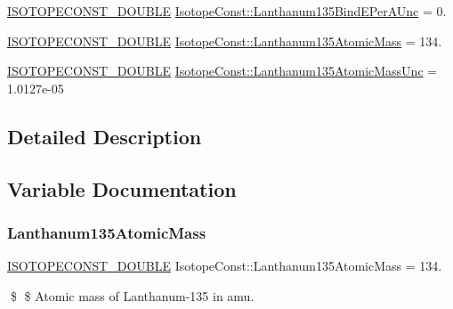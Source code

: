 \begin{DoxyCompactItemize}
\mbox{\hyperlink{group___isotope_const-_macros_ga8f45a7272ce02c0b4c65c44636ed719a}{I\+S\+O\+T\+O\+P\+E\+C\+O\+N\+S\+T\+\_\+\+D\+O\+U\+B\+LE}} \mbox{\hyperlink{group___isotope_const-_lanthanum-_la135_ga762828c68b37076891bc9b852ed06526}{Isotope\+Const\+::\+Lanthanum135\+Bind\+E\+Per\+A\+Unc}} = 0.
\item 
\mbox{\hyperlink{group___isotope_const-_macros_ga8f45a7272ce02c0b4c65c44636ed719a}{I\+S\+O\+T\+O\+P\+E\+C\+O\+N\+S\+T\+\_\+\+D\+O\+U\+B\+LE}} \mbox{\hyperlink{group___isotope_const-_lanthanum-_la135_ga94e1754aa7f40b00c7176e3f3a611619}{Isotope\+Const\+::\+Lanthanum135\+Atomic\+Mass}} = 134.
\item 
\mbox{\hyperlink{group___isotope_const-_macros_ga8f45a7272ce02c0b4c65c44636ed719a}{I\+S\+O\+T\+O\+P\+E\+C\+O\+N\+S\+T\+\_\+\+D\+O\+U\+B\+LE}} \mbox{\hyperlink{group___isotope_const-_lanthanum-_la135_ga64df983473f501711ad2a94d500e7c33}{Isotope\+Const\+::\+Lanthanum135\+Atomic\+Mass\+Unc}} = 1.\+0127e-\/05
\end{DoxyCompactItemize}


\subsection{Detailed Description}


\subsection{Variable Documentation}
\mbox{\label{group___isotope_const-_lanthanum-_la135_ga94e1754aa7f40b00c7176e3f3a611619}} 
\subsubsection{\texorpdfstring{Lanthanum135\+Atomic\+Mass}{Lanthanum135AtomicMass}}
{\footnotesize\ttfamily \mbox{\hyperlink{group___isotope_const-_macros_ga8f45a7272ce02c0b4c65c44636ed719a}{I\+S\+O\+T\+O\+P\+E\+C\+O\+N\+S\+T\+\_\+\+D\+O\+U\+B\+LE}} Isotope\+Const\+::\+Lanthanum135\+Atomic\+Mass = 134.}

\$ \$ Atomic mass of Lanthanum-\/135 in amu. \mbox{\label{group___isotope_const-_lanthanum-_la135_ga64df983473f501711ad2a94d500e7c33}} 
